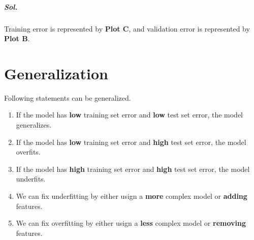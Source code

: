 \documentclass{scrartcl}
\begin{document}
	\subparagraph{Sol.} Training error is represented by \textbf{Plot C}, and validation error is represented by \textbf{Plot B}.
	
	\pagebreak
	
	\section{Generalization}
	
	Following statements can be generalized.
	
	\begin{enumerate}[label*=(\Alph*)]
		\item If the model has \textbf{low} training set error and \textbf{low} test set error, the model generalizes.
		\item If the model has \textbf{low} training set error and \textbf{high} test set error, the model overfits.
		\item If the model has \textbf{high} training set error and \textbf{high} test set error, the model underfits.
		\item We can fix underfitting by either usign a \textbf{more} complex model or \textbf{adding} features.
		\item We can fix overfitting by either usign a \textbf{less} complex model or \textbf{removing} features.
	\end{enumerate}
	
\end{document}
